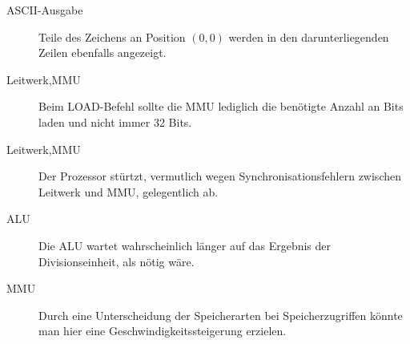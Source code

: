 \begin{description}
\item[ASCII-Ausgabe] Teile des Zeichens an Position \((0,0)\) werden in den
darunterliegenden Zeilen ebenfalls angezeigt.
\item[Leitwerk,MMU] Beim LOAD-Befehl sollte die MMU lediglich die ben\"otigte
Anzahl an Bits laden und nicht immer 32 Bits.
\item[Leitwerk,MMU] Der Prozessor st\"urtzt, vermutlich wegen
Synchronisationsfehlern zwischen Leitwerk und MMU, gelegentlich ab.
\item[ALU] Die ALU wartet wahrscheinlich l\"anger auf das Ergebnis der
Divisionseinheit, als n\"otig w\"are.
\item[MMU] Durch eine Unterscheidung der Speicherarten bei Speicherzugriffen
k\"onnte man hier eine Geschwindigkeitssteigerung erzielen. 
\end{description}
